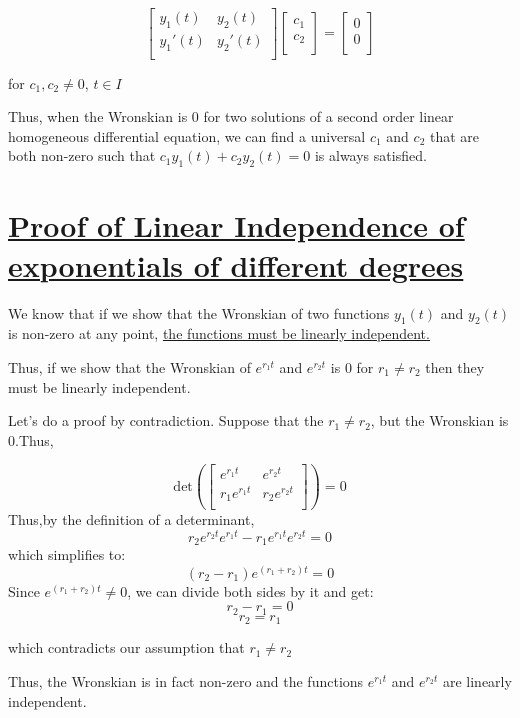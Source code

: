 \documentclass{report}
\begin{document}
$$
\begin{bmatrix}
    y_1(t) & y_2(t) \\
    y_1'(t) & y_2'(t) \\
\end{bmatrix}
\begin{bmatrix}
    c_1 \\
    c_2 \\
\end{bmatrix}
=
\begin{bmatrix}
    0 \\
    0 \\
\end{bmatrix}
$$

for $c_1, c_2 \neq 0$, $t \in I$

Thus, when the Wronskian is 0 for two solutions of a second order linear homogeneous differential equation, we can find a universal $c_1$ and $c_2$ that are both non-zero such that $c_1y_1(t) +c_2y_2(t) = 0$ is always satisfied. 


\section{\hyperref[th:expLinInd]{Proof of Linear Independence of exponentials of different degrees}}
\label{sec:prExpLinInd}
We know that  if we show that the Wronskian of two functions $y_1(t)$ and $y_2(t)$ is non-zero at any point, \hyperref[th:wronLinInd]{the functions must be linearly independent.}

Thus, if we show that the Wronskian of $e^{r_1t}$ and $e^{r_2t}$ is 0 for $r_1 \neq r_2$ then they must be linearly independent.

Let's do a proof by contradiction. Suppose that the $r_1 \neq r_2$, but the Wronskian is 0.Thus,

$$
    \text{det}\left(\begin{bmatrix}
        e^{r_1t} & e^{r_2t} \\
        r_1 e^{r_1t} & r_2 e^{r_2t} \\
    \end{bmatrix}\right)
    = 0
$$
Thus,by the definition of a determinant,
$$r_2e^{r_2t}e^{r_1t} -r_1e^{r_1t}e^{r_2t} = 0$$
which simplifies to:
$$(r_2-r_1)e^{(r_1+r_2)t} = 0$$
Since $e^{(r_1+r_2)t} \neq 0$, we can divide both sides by it and get:
$$r_2 -r_1 = 0$$
$$r_2 = r_1$$

which contradicts our assumption that $r_1 \neq r_2$

Thus, the Wronskian is in fact non-zero and the functions $e^{r_1t}$ and $e^{r_2t}$ are linearly independent.
\end{document}
